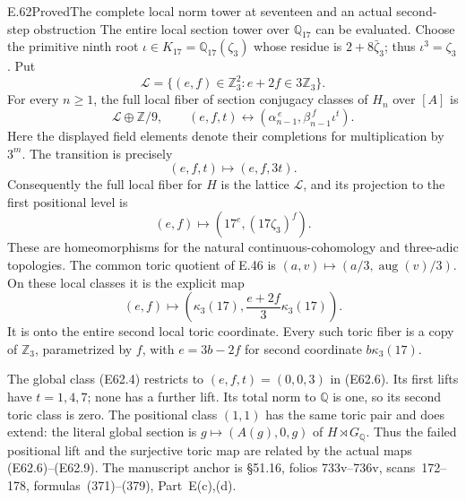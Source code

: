 \begin{statement}{E.62}{Proved}{The complete local norm tower at seventeen and an actual second-step obstruction}
The entire local section tower over
$\mathbb Q_{17}$ can be evaluated.
Choose the primitive ninth root
$\iota\in K_{17}=\mathbb Q_{17}(\zeta_3)$
whose residue is $2+8\bar\zeta_3$; thus
$\iota^3=\zeta_3$.
Put
\[
 \mathcal L=\{(e,f)\in\mathbb Z_3^2:
                         e+2f\in3\mathbb Z_3\}.
 \tag{E62.5}
\]
For every $n\ge1$, the full local fiber of
section conjugacy classes of $H_n$ over
$[A]$ is
\[
 \mathcal L\oplus\mathbb Z/9,\qquad
 (e,f,t)\longleftrightarrow
             (\alpha_{n-1}^{\,e},
                         \beta_{n-1}^{\,f}\iota^t).
 \tag{E62.6}
\]
Here the displayed field elements denote
their completions for multiplication by
$3^m$. The transition is precisely
\[
                  (e,f,t)\longmapsto(e,f,3t).
 \tag{E62.7}
\]
Consequently the full local fiber for $H$
is the lattice $\mathcal L$, and its
projection to the first positional level is
\[
           (e,f)\longmapsto
                   (17^e,(17\zeta_3)^f).
 \tag{E62.8}
\]
These are homeomorphisms for the natural
continuous-cohomology and three-adic
topologies. The common toric quotient of
E.46 is $(a,v)\mapsto(a/3,\operatorname{aug}(v)/3)$.
On these local classes it is the explicit map
\[
       (e,f)\longmapsto
       \left(\kappa_3(17),
                  \frac{e+2f}{3}\kappa_3(17)\right).
 \tag{E62.9}
\]
It is onto the entire second local toric
coordinate. Every such toric fiber is a copy
of $\mathbb Z_3$, parametrized by $f$, with
$e=3b-2f$ for second coordinate
$b\kappa_3(17)$.

The global class (E62.4) restricts to
$(e,f,t)=(0,0,3)$ in (E62.6).
Its first lifts have $t=1,4,7$;
none has a further lift.
Its total norm to $\mathbb Q$ is one,
so its second toric class is zero.
The positional class $(1,1)$ has the
same toric pair and does extend:
the literal global section is
$g\mapsto(A(g),0,g)$ of $H\rtimes G_{\mathbb Q}$.
Thus the failed positional lift and the
surjective toric map are related by the
actual maps (E62.6)--(E62.9).
The manuscript anchor is \S51.16, folios
733v--736v, scans~172--178, formulas~(371)--(379),
Part~E(c),(d).
\end{statement}

